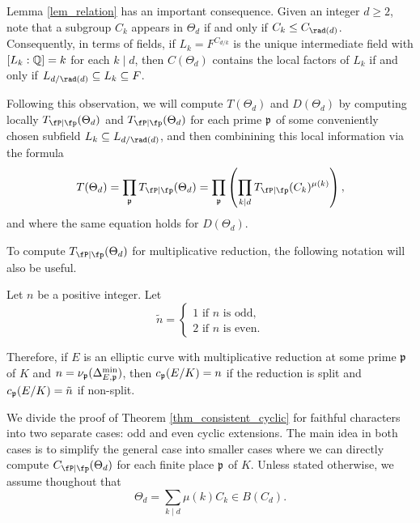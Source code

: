 \begin{rem}\label{rem_radical}
    Lemma \ref{lem_relation} has an important consequence. Given an integer $d\geq2$, note that a subgroup $C_k$ appears in $\Theta_d$ if and only if $C_k\leq C_{\rad(d)}$. Consequently, in terms of fields, if $L_k=F^{C_{d/k}}$ is the unique intermediate field with $[L_k:\mathbb{Q}]=k$ for each $k\mid d$, then $C(\Theta_d)$ contains the local factors of $L_k$ if and only if $L_{d/\rad(d)}\subseteq L_k\subseteq F$.

    Following this observation, we will compute $T(\Theta_d)$ and $D(\Theta_d)$ by computing locally $\Tp(\Theta_d)$ and $\Tp(\Theta_d)$ for each prime $\mathfrak{p}$ of some conveniently chosen subfield $L_k\subseteq L_{d/\rad(d)}$, and then combinining this local information via the formula
    \begin{equation}\label{eqn_local_contr}
        T(\Theta_d)=\prod_{\pp}\Tp(\Theta_d)=\prod_\pp\left(\prod_{k\mid d} \Tp(C_k)^{\mu(k)}\right),    
    \end{equation}
    and where the same equation holds for $D(\Theta_d)$.
\end{rem}

To compute $\Tp(\Theta_d)$ for multiplicative reduction, the following notation will also be useful.

\begin{notation}\label{not_n}
    Let $n$ be a positive integer. Let 
    \[
        \tilde{n}=
        \begin{cases}
            1 \text{ if } n \text{ is odd,}\\
            2 \text{ if } n \text{ is even.}
        \end{cases}
    \]
\end{notation}
Therefore, if $E$ is an elliptic curve with multiplicative reduction at some prime $\mathfrak{p}$ of $K$ and $n=\nu_{\mathfrak{p}}(\Delta_{E,\mathfrak{p}}^{\min})$, then $c_{\mathfrak{p}}(E/K)=n$ if the reduction is split and $c_{\mathfrak{p}}(E/K)=\tilde{n}$ if non-split.

We divide the proof of Theorem \ref{thm_consistent_cyclic} for faithful characters into two separate cases: odd and even cyclic extensions. The main idea in both cases is to simplify the general case into smaller cases where we can directly compute $\Cp(\Theta_d)$ for each finite place $\mathfrak{p}$ of $K$. Unless stated otherwise, we assume thoughout that $$\Theta_d=\sum_{k\mid d}\mu(k)C_k\in B(C_d).$$





 
